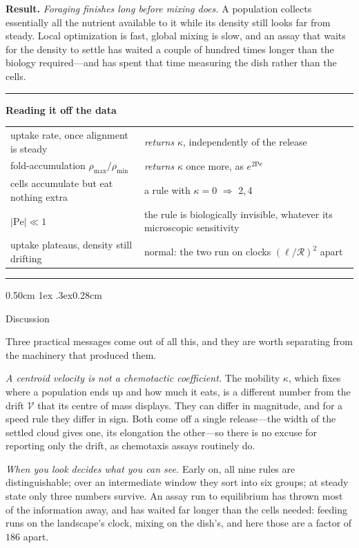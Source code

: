 \documentclass[
  reprint,
  superscriptaddress,
  amsmath,
  amssymb,
  aps,
  pre,
  nofootinbib,
  floatfix
]{revtex4-2}
\makeatletter
\newenvironment{readout}
  {\par\addvspace{1.2ex}\noindent\rule{\columnwidth}{0.6pt}\par\nobreak
   \vspace{0.3ex}\noindent\textbf{Reading it off the data}\par\nobreak
   \vspace{0.4ex}\footnotesize\noindent
   \setlength{\parindent}{0pt}%
   \setlength{\emergencystretch}{3em}%
   \let\readout@restore\@arrayparboxrestore
   \def\@arrayparboxrestore{\readout@restore\raggedright\let\\\tabularnewline}%
   \begin{tabular}{@{}p{0.42\columnwidth}@{\hspace{0.9em}}p{0.50\columnwidth}@{}}}
  {\end{tabular}\par\nobreak\vspace{0.4ex}%
   \noindent\rule{\columnwidth}{0.6pt}\par\addvspace{1.0ex}}
\def\section{\@startsection{section}{1}{\z@}%
  {0.50cm \@plus1ex \@minus.3ex}{0.28cm}%
  {\normalfont\small\bfseries\raggedright}}%
\makeatother
\begin{document}
\textbf{Result.}  \emph{Foraging finishes long before mixing does.}  A
population collects essentially all the nutrient available to it while its
density still looks far from steady.  Local optimization is fast, global
mixing is slow, and an assay that waits for the density to settle has waited a
couple of hundred times longer than the biology required---and has spent that
time measuring the dish rather than the cells.

\begin{readout}
uptake rate, once alignment is steady & \emph{returns} $\kappa$, independently
of the release\\[2pt]
fold-accumulation $\rho_{\max}/\rho_{\min}$ & \emph{returns} $\kappa$ once
more, as $e^{2\mathrm{Pe}}$\\[2pt]
cells accumulate but eat nothing extra & a rule with $\kappa=0$
$\Rightarrow$ 2,\,4\\[2pt]
$|\mathrm{Pe}|\ll1$ & the rule is biologically invisible, whatever its
microscopic sensitivity\\[2pt]
uptake plateaus, density still drifting & normal: the two run on clocks
$(\ell/\mathcal R)^{2}$ apart\\
\end{readout}


\section{Discussion}
\label{sec:discussion}

Three practical messages come out of all this, and they are worth separating
from the machinery that produced them.

\emph{A centroid velocity is not a chemotactic coefficient.}  The mobility
$\kappa$, which fixes where a population ends up and how much it eats, is a
different number from the drift $\mathcal V$ that its centre of mass displays.
They can differ in magnitude, and for a speed rule they differ in sign.  Both
come off a single release---the width of the settled cloud gives one, its
elongation the other---so there is no excuse for reporting only the drift, as
chemotaxis assays routinely do.

\emph{When you look decides what you can see.}  Early on, all nine rules are
distinguishable; over an intermediate window they sort into six groups; at
steady state only three numbers survive.  An assay run to equilibrium has
thrown most of the information away, and has waited far longer than the cells
needed: feeding runs on the landscape's clock, mixing on the dish's, and here
those are a factor of $186$ apart.
\end{document}

